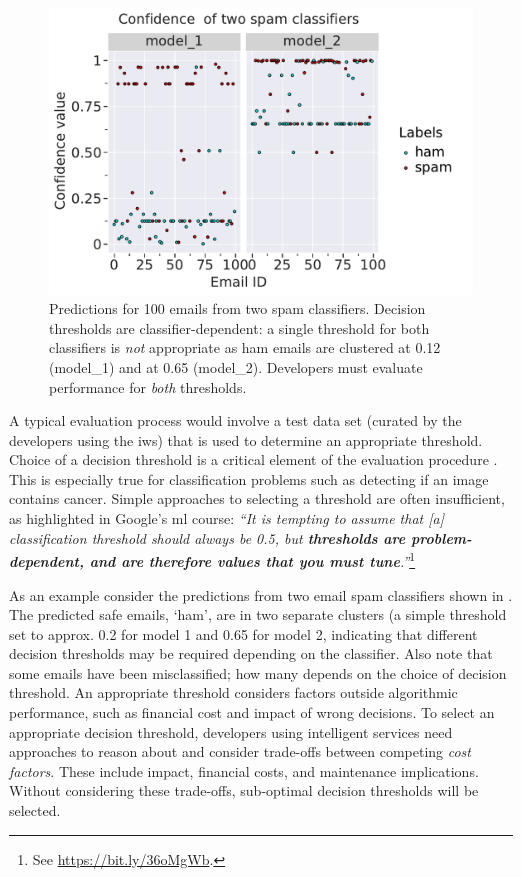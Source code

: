 \begin{figure}[t]
    \centering
    \includegraphics[width=.75\linewidth]{scatter.pdf}
    \caption{Predictions for 100 emails from two spam classifiers. Decision thresholds are classifier-dependent:  a single threshold for both classifiers is \textit{not} appropriate as ham emails are clustered at 0.12 (model\_1) and at 0.65 (model\_2). Developers must evaluate  performance for \textit{both} thresholds.}
    \label{fig:example}
\end{figure}

A typical evaluation process would involve a test data set (curated by the developers using the \gls{iws}) that is used to determine an appropriate threshold. Choice of a decision threshold is a critical element of the evaluation procedure \citep{hardt2016equality}. This is especially true for classification problems such as detecting if an image contains cancer. Simple approaches to selecting a threshold are often insufficient, as highlighted in Google's \gls{ml} course: \textit{``It is tempting to assume that [a] classification threshold should always be 0.5, but \textbf{thresholds are problem-dependent, and are therefore values that you must tune}.''}\footnote{See \url{https://bit.ly/36oMgWb}.} 

As an example consider the predictions from two email spam classifiers shown in . The predicted safe emails, `ham', are in two separate clusters (a simple threshold set to approx. 0.2 for model 1 and 0.65 for model 2, indicating that different decision thresholds may be required depending on the classifier. Also note that some emails have been misclassified; how many depends on the choice of decision threshold. An appropriate threshold considers factors outside algorithmic performance, such as financial cost and impact of wrong decisions. To select an appropriate decision threshold, developers using intelligent services need approaches to reason about and consider trade-offs between competing \textit{cost factors}. These include impact, financial costs, and maintenance implications. Without considering these trade-offs, sub-optimal decision thresholds will be selected.   

